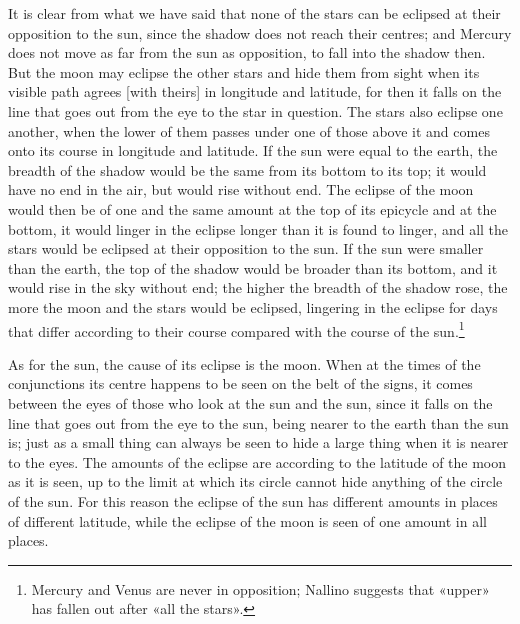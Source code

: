 \documentclass[11pt]{article}
\newcommand{\ArPage}[1]{\marginpar{\footnotesize\color{gray}Ar.\,p.\,#1}}
\begin{document}
\par \ArPage{84}It is clear from what we have said that none of the stars can be eclipsed at their opposition to the sun, since the shadow does not reach their centres; and Mercury does not move as far from the sun as opposition, to fall into the shadow then. But the moon may eclipse the other stars and hide them from sight when its visible path agrees [with theirs] in longitude and latitude, for then it falls on the line that goes out from the eye to the star in question. The stars also eclipse one another, when the lower of them passes under one of those above it and comes onto its course in longitude and latitude. If the sun were equal to the earth, the breadth of the shadow would be the same from its bottom to its top; it would have no end in the air, but would rise without end. The eclipse of the moon would then be of one and the same amount at the top of its epicycle and at the bottom, it would linger in the eclipse longer than it is found to linger, and all the stars would be eclipsed at their opposition to the sun. If the sun were smaller than the earth, the top of the shadow would be broader than its bottom, and it would rise in the sky without end; the higher the breadth of the shadow rose, the more the moon and the stars would be eclipsed, lingering in the eclipse for days that differ according to their course compared with the course of the sun.\footnote{Mercury and Venus are never in opposition; Nallino suggests that «upper» has fallen out after «all the stars».}\par
\par As for the sun, the cause of its eclipse is the moon. When at the times of the conjunctions its centre happens to be seen on the belt of the signs, it comes between the eyes of those who look at the sun and the sun, since it falls on the line that goes out from the eye to the sun, being nearer to the earth than the sun is; just as a small thing can always be seen to hide a large thing when it is nearer to the eyes. The amounts of the eclipse are according to the latitude of the moon as it is seen, up to the limit at which its circle cannot hide anything of the circle of the sun. For this reason the eclipse of the sun has different amounts in places of different latitude, while the eclipse of the moon is seen of one amount in all places.\par
\end{document}
